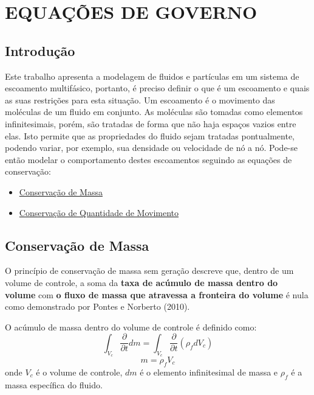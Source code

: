 \chapter{\textbf{EQUAÇÕES DE GOVERNO}}
\label{sec_eq_governo}
\section{\textbf{Introdução}}
Este trabalho apresenta a modelagem de fluidos e partículas em um sistema de escoamento multifásico, portanto, é preciso definir o que é um escoamento e quais as suas restrições para esta situação.
Um escoamento é o movimento das moléculas de um fluido em conjunto.
As moléculas são tomadas como elementos infinitesimais, porém, são tratadas de forma que não haja espaços vazios entre elas.
Isto permite que as propriedades do fluido sejam tratadas pontualmente, podendo variar, por exemplo, sua densidade ou velocidade de nó a nó.
Pode-se então modelar o comportamento destes escoamentos seguindo as equações de conservação:
\begin{itemize}
	\item \hyperref[cons_massa]{Conservação de Massa}
	\item \hyperref[cons_qmov]{Conservação de Quantidade de Movimento}
\end{itemize}

\section{\textbf{Conservação de Massa}}
\label{sec_cons_massa}
O princípio de conservação de massa sem geração descreve que, dentro de um volume de controle, a soma da \textbf{taxa de acúmulo de massa dentro do volume} com \textbf{o fluxo de massa que atravessa a fronteira do volume} é nula como demonstrado por Pontes e Norberto (2010)\cite{pontes_norberto}.

O acúmulo de massa dentro do volume de controle é definido como:
\begin{equation}
    \int_{V_c}\dfrac{\partial}{\partial t} dm =  \int_{V_c}\dfrac{\partial}{\partial t} (\rho_f d V_c)
    \label{acumulo_massa}
\end{equation}
\begin{equation}
    m =  \rho_f V_c
    \label{densidade}
\end{equation}
onde $V_c$ é o volume de controle, $dm$ é o elemento infinitesimal de massa e $\rho_f$ é a massa específica do fluido.

